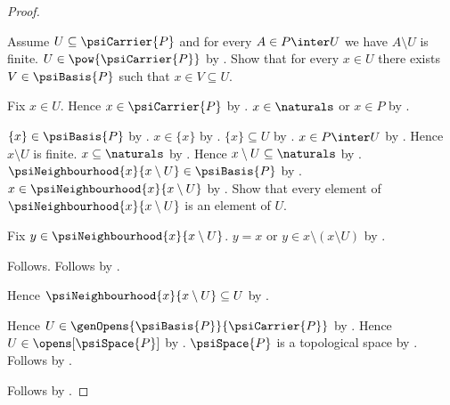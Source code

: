 \begin{proof}
\begin{subproof}
        Assume $U\subseteq\psiCarrier{P}$ and
            for every $A\in P\inter U$ we have $A\setminus U$ is finite.
        $U\in\pow{\psiCarrier{P}}$ by .
        Show that for every $x\in U$ there exists $V\in\psiBasis{P}$
            such that $x\in V\subseteq U$.
        \begin{subproof}
            Fix $x\in U$.
            Hence $x\in\psiCarrier{P}$ by .
            $x\in\naturals$ or $x\in P$
                by .
            \begin{byCase}
                    $\{x\}\in\psiBasis{P}$
                        by .
                    $x\in\{x\}$ by .
                    $\{x\}\subseteq U$ by .
                    $x\in P\inter U$ by .
                    Hence $x\setminus U$ is finite.
                    $x\subseteq\naturals$ by
                        .
                    Hence $x\setminus U\subseteq\naturals$
                        by .
                    $\psiNeighbourhood{x}{x\setminus U}\in\psiBasis{P}$
                        by .
                    $x\in\psiNeighbourhood{x}{x\setminus U}$
                        by .
                    Show that every element of
                        $\psiNeighbourhood{x}{x\setminus U}$
                        is an element of $U$.
                    \begin{subproof}
                        Fix $y\in\psiNeighbourhood{x}{x\setminus U}$.
                        $y=x$ or $y\in x\setminus(x\setminus U)$
                            by
                            .
                        \begin{byCase}
                                Follows.
                                Follows by .
                        \end{byCase}
                    \end{subproof}
                    Hence $\psiNeighbourhood{x}{x\setminus U}\subseteq U$
                        by .
            \end{byCase}
        \end{subproof}
        Hence $U\in\genOpens{\psiBasis{P}}{\psiCarrier{P}}$
            by .
        Hence $U\in\opens[\psiSpace{P}]$ by .
        $\psiSpace{P}$ is a topological space
            by .
        Follows by .
    \end{subproof}
    Follows by \auto.
\end{proof}

